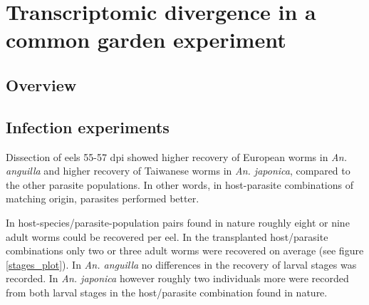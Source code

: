 
\chapter{Transcriptomic divergence in a common garden experiment}
\label{cha:tra-diff}


\ifpdf
    \graphicspath{{6_rna_seq/figures/PNG/}{6_rna_seq/figures/PDF/}{6_rna_seq/figures/}}
\else
    \graphicspath{{6_rna_seq/figures/EPS/}{6_rna_seq/figures/}}
\fi



\section{Overview}


\section{Infection experiments}

Dissection of eels 55-57 dpi showed higher recovery of European worms
in \textit{An. anguilla} and higher recovery of Taiwanese worms in
\textit{An. japonica}, compared to the other parasite populations. In
other words, in host-parasite combinations of matching origin,
parasites performed better.


In host-species/parasite-population pairs found in nature roughly
eight or nine adult worms could be recovered per eel. In the
transplanted host/parasite combinations only two or three adult worms
were recovered on average (see figure \ref{stages_plot}). In
\textit{An. anguilla} no differences in the recovery of larval stages
was recorded. In \textit{An. japonica} however roughly two individuals
more were recorded from both larval stages in the host/parasite
combination found in nature.

